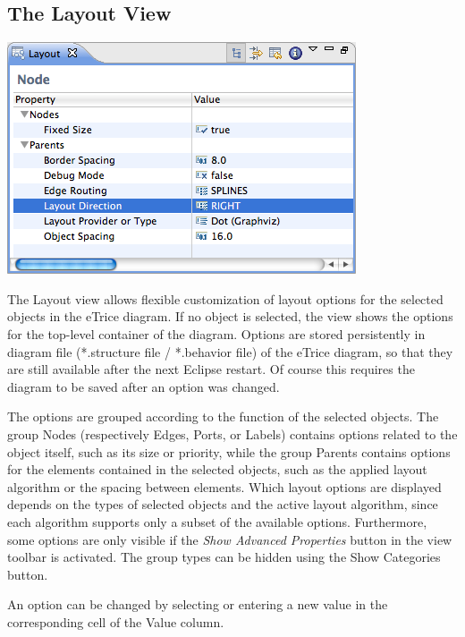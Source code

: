 \subsection{\label{layoutView}The Layout View}

\includegraphics[width=\linewidth]{images/043-LayoutView.png}

The Layout view allows flexible customization of layout options for the selected objects in the eTrice diagram. If no object is selected, the view shows the options for the top-level container of the diagram. Options are stored persistently in diagram file (*.structure file / *.behavior file) of the eTrice diagram, so that they are still available after the next Eclipse restart. Of course this requires the diagram to be saved after an option was changed.

The options are grouped according to the function of the selected objects. The group Nodes (respectively Edges, Ports, or Labels) contains options related to the object itself, such as its size or priority, while the group Parents contains options for the elements contained in the selected objects, such as the applied layout algorithm or the spacing between elements. Which layout options are displayed depends on the types of selected objects and the active layout algorithm, since each algorithm supports only a subset of the available options. Furthermore, some options are only visible if the \textit{Show Advanced Properties} button in the view toolbar is activated. The group types can be hidden using the Show Categories button.

An option can be changed by selecting or entering a new value in the corresponding cell of the Value column.

